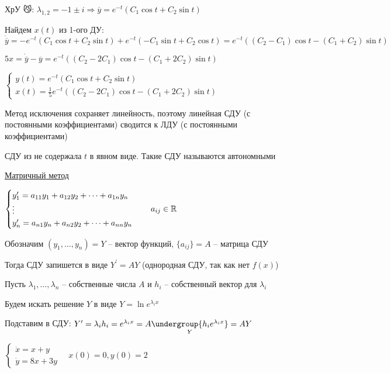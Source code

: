 \documentclass[12pt]{article}
\begin{document}
    ХрУ 😼: $\lambda_{1,2} = -1 \pm i \Longrightarrow \overline{y} = e^{-t} (C_1 \cos t + C_2 \sin t)$

    Найдем $x(t)$ из 1-ого ДУ: $\dot{\overline{y}} = -e^{-t} (C_1 \cos t + C_2 \sin t) + e^{-t} (-C_1 \sin t + C_2 \cos t) = e^{-t} ((C_2 - C_1) \cos t - (C_1 + C_2) \sin t)$

    $5x = \dot{\overline{y}} - \overline{y} = e^{-t} ((C_2 - 2C_1) \cos t - (C_1 + 2C_2) \sin t)$

    $\begin{cases}
         y(t) = e^{-t} (C_1 \cos t + C_2 \sin t) \\
         x(t) = \frac{1}{5} e^{-t} ((C_2 - 2C_1) \cos t - (C_1 + 2C_2) \sin t)
    \end{cases}$

    \Nota Метод исключения сохраняет линейность, поэтому линейная СДУ (с постоянными коэффициентами) сводится к ЛДУ (с постоянными коэффициентами)

    \Nota СДУ из \Exs не содержала $t$ в явном виде. Такие СДУ называются автономными

    \mediumvspace

    \underline{Матричный метод}

    $\begin{cases}
         y^{\prime}_1 = a_{11}y_1 + a_{12}y_2 + \dots + a_{1n} y_n \\
         \vdots \\
         y^{\prime}_n = a_{n1}y_n + a_{n2}y_2 + \dots + a_{nn} y_n
    \end{cases} \quad a_{ij} \in \mathbb{R}$

    Обозначим $(y_1, \dots, y_n) = Y$ -- вектор функций, $\{a_{ij}\} = A$ -- матрица СДУ

    Тогда СДУ запишется в виде $Y^\prime = AY$ (однородная СДУ, так как нет $f(x)$)

    Пусть $\lambda_1, \dots, \lambda_n$ -- собственные числа $A$ и $h_i$ -- собственный вектор для $\lambda_i$

    Будем искать решение $Y$ в виде $Y = \ln e^{\lambda_i x}$

    Подставим в СДУ: $Y^\prime = \lambda_i h_i = e^{\lambda_i x} = A \underset{Y}{\undergroup{h_i e^{\lambda_i x}}} = AY$

    \Ex
    $\begin{cases}
         \dot x = x + y \\
         \dot y = 8x + 3y
    \end{cases} \quad x(0) = 0, y(0) = 2$
\end{document}
